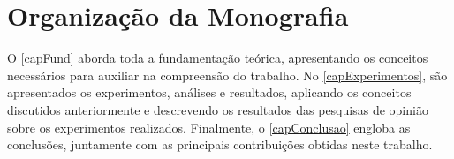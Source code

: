 

\section{Organização da Monografia}

O \autoref{capFund} aborda toda a fundamentação teórica, apresentando os conceitos necessários para auxiliar na compreensão do trabalho. No \autoref{capExperimentos}, são apresentados os experimentos, análises e resultados, aplicando os conceitos discutidos anteriormente e descrevendo os resultados das pesquisas de opinião sobre os experimentos realizados. Finalmente, o \autoref{capConclusao} engloba as conclusões, juntamente com as principais contribuições obtidas neste trabalho.

